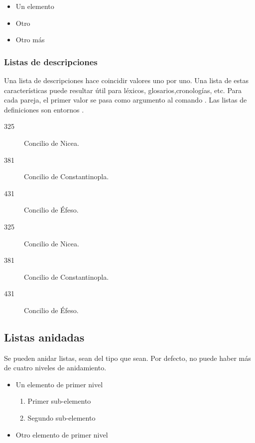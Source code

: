 \begin{quotation*}
\begin{itemize}
    \item Un elemento
    \item Otro
    \item Otro más
\end{itemize}
\end{quotation*}

\subsubsection{Listas de descripciones}

Una lista de descripciones hace coincidir valores uno por uno. Una lista de estas características puede resultar útil para léxicos, glosarios,cronologías, etc. Para cada pareja, el primer valor se pasa como argumento al comando . Las listas de definiciones son entornos .


\begin{latexcode}
\begin{description}
    \item[325]Concilio de Nicea.
    \item[381]Concilio de Constantinopla.
    \item[431]Concilio de Éfeso.
\end{description}
\end{latexcode}

\begin{quotation*}
\begin{description}
    \item[325]Concilio de Nicea.
    \item[381]Concilio de Constantinopla.
    \item[431]Concilio de Éfeso.
\end{description}
\end{quotation*}

\subsection{Listas anidadas}

Se pueden anidar listas, sean del tipo que sean. Por defecto, no puede haber más de cuatro niveles de anidamiento.

\begin{latexcode}
\begin{itemize}
    \item Un elemento de primer nivel
    \begin{enumerate}
            \item Primer sub-elemento
            \item Segundo sub-elemento
    \end{enumerate}
    \item Otro elemento de primer nivel
\end{itemize}
\end{latexcode}

